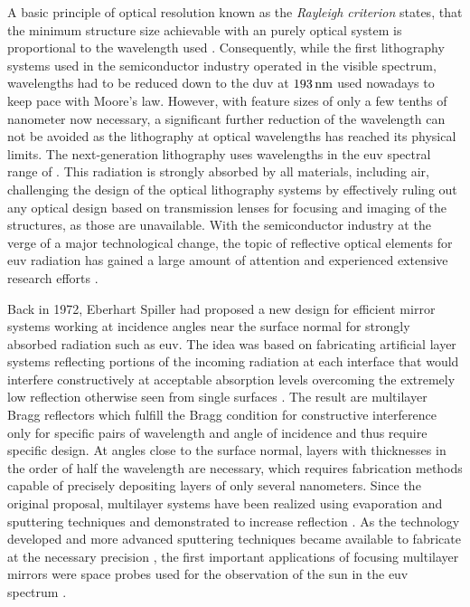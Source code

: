 A basic principle of optical resolution known as the \emph{Rayleigh criterion} states, that the minimum structure size achievable with an purely optical system is proportional to the wavelength used \cite{lord_rayleigh_xxxi._1879}. Consequently, while the first lithography systems used in the semiconductor industry operated in the visible spectrum, wavelengths had to be reduced down to the \gls{duv} at $\nm{193}$ used nowadays to keep pace with Moore's law. However, with feature sizes of only a few tenths of nanometer now necessary, a significant further reduction of the wavelength can not be avoided as the lithography at optical wavelengths has reached its physical limits. The next-generation lithography uses wavelengths in the \gls{euv} spectral range of . This radiation is strongly absorbed by all materials, including air, challenging the design of the optical lithography systems by effectively ruling out any optical design based on transmission lenses for focusing and imaging of the structures, as those are unavailable. With the semiconductor industry at the verge of a major technological change, the topic of reflective optical elements for \gls{euv} radiation has gained a large amount of attention and experienced extensive research efforts \cite{bakshi_euv_2009}.

Back in 1972, Eberhart Spiller had proposed a new design for efficient mirror systems working at incidence angles near the surface normal for strongly absorbed radiation such as \gls{euv}. The idea was based on fabricating artificial layer systems reflecting portions of the incoming radiation at each interface that would interfere constructively at acceptable absorption levels overcoming the extremely low reflection otherwise seen from single surfaces \cite{spiller_low-loss_1972}. The result are multilayer Bragg reflectors which fulfill the Bragg condition for constructive interference only for specific pairs of wavelength and angle of incidence and thus require specific design. At angles close to the surface normal, layers with thicknesses in the order of half the wavelength are necessary, which requires fabrication methods capable of precisely depositing layers of only several nanometers. Since the original proposal, multilayer systems have been realized using evaporation and sputtering techniques and demonstrated to increase reflection \cite{spiller_reflective_1976, underwood_layered_1981}. As the technology developed and more advanced sputtering techniques became available to fabricate at the necessary precision \cite{stearns_fabrication_1991}, the first important applications of focusing multilayer mirrors were space probes used for the observation of the sun in the \gls{euv} spectrum \cite{chauvineau_description_1992, clette_eit:_1995, spiller_soft_1994}.

